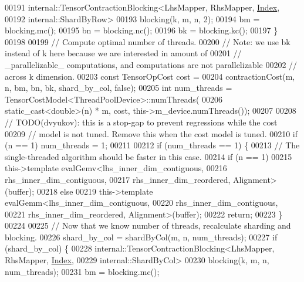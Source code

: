 \begin{DoxyCode}
00191       internal::TensorContractionBlocking<LhsMapper, RhsMapper, \hyperlink{namespace_eigen_a62e77e0933482dafde8fe197d9a2cfde}{Index},
00192                                           internal::ShardByRow>
00193           blocking(k, m, n, 2);
00194       bm = blocking.mc();
00195       bn = blocking.nc();
00196       bk = blocking.kc();
00197     \}
00198 
00199     \textcolor{comment}{// Compute optimal number of threads.}
00200     \textcolor{comment}{// Note: we use bk instead of k here because we are interested in amount of}
00201     \textcolor{comment}{// \_parallelizable\_ computations, and computations are not parallelizable}
00202     \textcolor{comment}{// across k dimension.}
00203     \textcolor{keyword}{const} TensorOpCost cost =
00204         contractionCost(m, n, bm, bn, bk, shard\_by\_col, \textcolor{keyword}{false});
00205     \textcolor{keywordtype}{int} num\_threads = TensorCostModel<ThreadPoolDevice>::numThreads(
00206         static\_cast<double>(n) * m, cost, this->m\_device.numThreads());
00207 
00208     \textcolor{comment}{// TODO(dvyukov): this is a stop-gap to prevent regressions while the cost}
00209     \textcolor{comment}{// model is not tuned. Remove this when the cost model is tuned.}
00210     \textcolor{keywordflow}{if} (n == 1) num\_threads = 1;
00211 
00212     \textcolor{keywordflow}{if} (num\_threads == 1) \{
00213       \textcolor{comment}{// The single-threaded algorithm should be faster in this case.}
00214       \textcolor{keywordflow}{if} (n == 1)
00215         this->\textcolor{keyword}{template} evalGemv<lhs\_inner\_dim\_contiguous,
00216                                 rhs\_inner\_dim\_contiguous,
00217                                 rhs\_inner\_dim\_reordered, Alignment>(buffer);
00218       \textcolor{keywordflow}{else}
00219         this->\textcolor{keyword}{template} evalGemm<lhs\_inner\_dim\_contiguous,
00220                                 rhs\_inner\_dim\_contiguous,
00221                                 rhs\_inner\_dim\_reordered, Alignment>(buffer);
00222       \textcolor{keywordflow}{return};
00223     \}
00224 
00225     \textcolor{comment}{// Now that we know number of threads, recalculate sharding and blocking.}
00226     shard\_by\_col = shardByCol(m, n, num\_threads);
00227     \textcolor{keywordflow}{if} (shard\_by\_col) \{
00228       internal::TensorContractionBlocking<LhsMapper, RhsMapper, \hyperlink{namespace_eigen_a62e77e0933482dafde8fe197d9a2cfde}{Index},
00229                                           internal::ShardByCol>
00230           blocking(k, m, n, num\_threads);
00231       bm = blocking.mc();

\end{DoxyCode}
